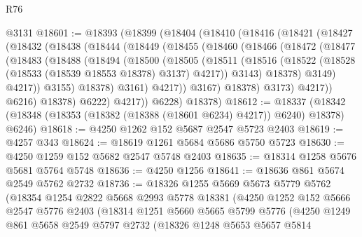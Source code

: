 \begin{lexlean}{R76}
\begin{coremodule}
    @3131
@18601 := @18393
    (@18399
      (@18404
        (@18410
          (@18416
            (@18421
              (@18427
                (@18432
                  (@18438
                    (@18444
                      (@18449
                        (@18455
                          (@18460
                            (@18466
                              (@18472
                                (@18477
                                  (@18483
                                    (@18488
                                      (@18494
                                        (@18500
                                          (@18505
                                            (@18511
                                              (@18516
                                                (@18522
                                                  (@18528
                                                    (@18533 (@18539 @18553 @18378) @3137)
                                                    @4217))
                                                @3143)
                                              @18378)
                                            @3149)
                                          @4217))
                                      @3155)
                                    @18378)
                                  @3161)
                                @4217))
                            @3167)
                          @18378)
                        @3173)
                      @4217))
                  @6216)
                @18378)
              @6222)
            @4217))
        @6228)
      @18378)
@18612 := @18337
    (@18342 (@18348 (@18353 (@18382 (@18388 (@18601 @6234) @4217)) @6240) @18378) @6246)
@18618 := @4250 @1262 @152 @5687 @2547 @5723 @2403
@18619 := @4257 @343
@18624 := @18619 @1261 @5684 @5686 @5750 @5723
@18630 := @4250 @1259 @152 @5682 @2547 @5748 @2403
@18635 := @18314 @1258 @5676 @5681 @5764 @5748
@18636 := @4250 @1256
@18641 := @18636 @861 @5674 @2549 @5762 @2732
@18736 := @18326
    @1255
    @5669
    @5673
    @5779
    @5762
    (@18354
      @1254
      @2822
      @5668
      @2993
      @5778
      @18381
      (@4250
        @1252
        @152
        @5666
        @2547
        @5776
        @2403
        (@18314
          @1251
          @5660
          @5665
          @5799
          @5776
          (@4250
            @1249
            @861
            @5658
            @2549
            @5797
            @2732
            (@18326
              @1248
              @5653
              @5657
              @5814

\end{coremodule}
\end{lexlean}
